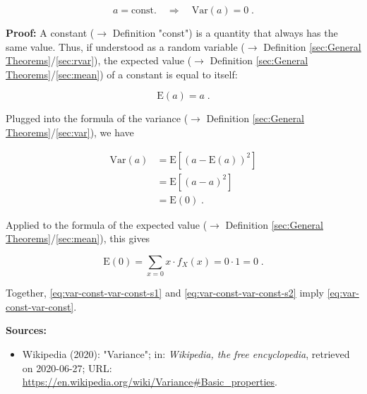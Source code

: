 \documentclass[a4paper,12pt,twoside]{book}
\begin{document}
\begin{equation} \label{eq:var-const-var-const}
a = \text{const.} \quad \Rightarrow \quad \mathrm{Var}(a) = 0 \; .
\end{equation}


\vspace{1em}
\textbf{Proof:} A constant ($\rightarrow$ Definition "const") is a quantity that always has the same value. Thus, if understood as a random variable ($\rightarrow$ Definition \ref{sec:General Theorems}/\ref{sec:rvar}), the expected value ($\rightarrow$ Definition \ref{sec:General Theorems}/\ref{sec:mean}) of a constant is equal to itself:

\begin{equation} \label{eq:var-const-mean-const}
\mathrm{E}(a) = a \; .
\end{equation}

Plugged into the formula of the variance ($\rightarrow$ Definition \ref{sec:General Theorems}/\ref{sec:var}), we have

\begin{equation} \label{eq:var-const-var-const-s1}
\begin{split}
\mathrm{Var}(a) &= \mathrm{E}\left[ (a-\mathrm{E}(a))^2 \right] \\
&= \mathrm{E}\left[ (a-a)^2 \right] \\
&= \mathrm{E}(0) \; .
\end{split}
\end{equation}

Applied to the formula of the expected value ($\rightarrow$ Definition \ref{sec:General Theorems}/\ref{sec:mean}), this gives

\begin{equation} \label{eq:var-const-var-const-s2}
\mathrm{E}(0) = \sum_{x=0} x \cdot f_X(x) = 0 \cdot 1 = 0 \; .
\end{equation}

Together, \eqref{eq:var-const-var-const-s1} and \eqref{eq:var-const-var-const-s2} imply \eqref{eq:var-const-var-const}.



\vspace{1em}
\textbf{Sources:}
\begin{itemize}
\item Wikipedia (2020): "Variance"; in: \textit{Wikipedia, the free encyclopedia}, retrieved on 2020-06-27; URL: \url{https://en.wikipedia.org/wiki/Variance#Basic_properties}.
\end{itemize}
\end{document}
